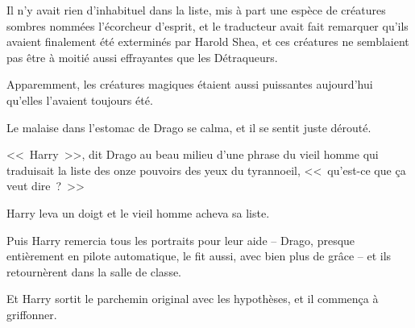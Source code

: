 Il n'y avait rien d'inhabituel dans la liste, mis à part une espèce de créatures sombres nommées l'écorcheur d'esprit, et le traducteur avait fait remarquer qu'ils avaient finalement été exterminés par Harold Shea, et ces créatures ne semblaient pas être à moitié aussi effrayantes que les Détraqueurs.

Apparemment, les créatures magiques étaient aussi puissantes aujourd'hui qu'elles l'avaient toujours été.

Le malaise dans l'estomac de Drago se calma, et il se sentit juste dérouté.

<<~Harry~>>, dit Drago au beau milieu d'une phrase du vieil homme qui traduisait la liste des onze pouvoirs des yeux du tyrannoeil, <<~qu'est-ce que ça veut dire~?~>>

Harry leva un doigt et le vieil homme acheva sa liste.

Puis Harry remercia tous les portraits pour leur aide -- Drago, presque entièrement en pilote automatique, le fit aussi, avec bien plus de grâce -- et ils retournèrent dans la salle de classe.

Et Harry sortit le parchemin original avec les hypothèses, et il commença à griffonner.

\baselineskip 

\savetrivseps
\setlength{\topsep}{0pt}
\setlength{\partopsep}{0pt}

